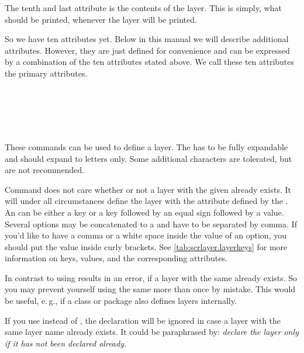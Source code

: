 The tenth and last attribute is the contents of the layer. This is simply,
what should be printed, whenever the layer will be printed.

So we have ten attributes yet. Below in this manual we will describe
additional attributes. However, they are just defined for convenience and can
be expressed by a combination of the ten attributes stated above. We call
these ten attributes the primary attributes.

\begin{Declaration}
  \\
  \\
  \\
  \\
\end{Declaration}
%
%
%
%
%
These commands can be used to define a layer. The  has to be
fully expandable and should expand to letters only. Some additional characters
are tolerated, but are not recommended.

Command  does not care whether or not a layer with the
given  already exists. It will under all circumstances
define the layer with the attribute defined by the .
An
 can be either a key or a key followed by an
equal sign followed by a value. Several options may be concatenated to
a  and have to be separated by comma. If you'd like to have
a comma or a white space inside the value of an option, you should put the
value inside curly brackets. See \autoref{tab:scrlayer.layerkeys} for
more information on keys, values, and the corresponding
attributes.

In contrast to  using  results in
an error, if a layer with the same  already exists. So you
may prevent yourself using the same  more than once by
mistake. This would be useful, e.\,g., if a class or package also defines
layers internally.

If you use  instead of , the
declaration will be ignored in case a layer with the same layer name already
exists. It could be paraphrased by: \emph{declare the layer only if it has not
  been declared already.}

